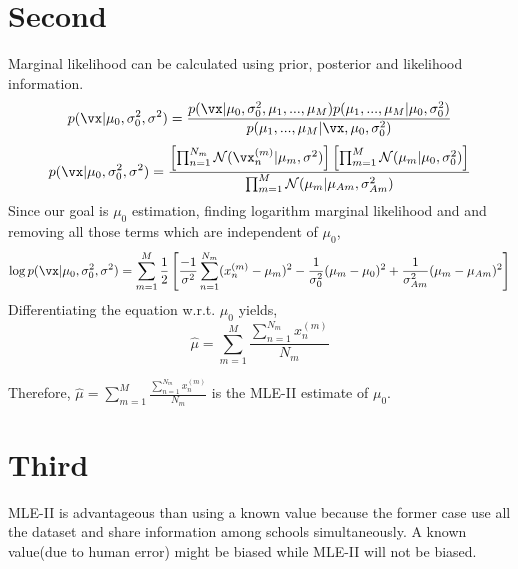\documentclass[a4paper,11pt]{article}
\begin{document}
\begin{pmisolution}
\section{Second}
Marginal likelihood can be calculated using prior, posterior and likelihood information.\\
\[ p(\vx|\mu_{0},\sigma^{2}_{0},\sigma^{2})= \frac{p(\vx|\mu_{0},\sigma^{2}_{0}, \mu_{1},...,\mu_{M})p(\mu_{1},...,\mu_{M}|\mu_{0},\sigma^{2}_{0})}{p(\mu_{1},...,\mu_{M}|\vx,\mu_{0},\sigma^{2}_{0})} \]
\[ p(\vx|\mu_{0},\sigma^{2}_{0},\sigma^{2}) =  \frac{\left[ \prod_{n=1}^{N_{m}}\mathcal{N}(\vx_{n}^{(m)}| \mu_{m},\sigma^{2}) \right] \left[\prod_{m=1}^{M} \mathcal{N}(\mu_{m}| \mu_{0},\sigma^{2}_{0})\right]}{\prod_{m=1}^{M}\mathcal{N}(\mu_{m}|\mu_{Am}, \sigma_{Am}^{2})} \]
Since our goal is \(\mu_{0}\) estimation, finding logarithm marginal likelihood and and removing all those terms which are independent of \(\mu_{0}\), \\
\[ \log p(\vx|\mu_{0},\sigma^{2}_{0},\sigma^{2}) = \sum_{m=1}^{M} \frac{1}{2}\left[ \frac{-1}{\sigma^{2}} \sum_{n=1}^{N_{m}}(x_{n}^{(m)}-\mu_{m})^{2} - \frac{1}{\sigma_{0}^{2}}(\mu_{m} - \mu_{0})^{2} + \frac{1}{\sigma_{Am}^{2}}(\mu_{m} - \mu_{Am})^{2}\right]\]
Differentiating the equation w.r.t. \(\mu_{0}\) yields,
\[ \hat{\mu} = \sum_{m=1}^{M} \frac{\sum_{n=1}^{N_{m}}x_{n}^{(m)}}{N_{m}} \]

Therefore, \(\hat{\mu} = \sum_{m=1}^{M} \frac{\sum_{n=1}^{N_{m}}x_{n}^{(m)}}{N_{m}}\) is the MLE-II estimate of \(\mu_{0}\).
\section{Third}
MLE-II is advantageous than using a known value because the former case use all the dataset and share information among schools simultaneously. A known value(due to human error) might be biased while MLE-II will not be biased.  
\end{pmisolution}
\end{document}
